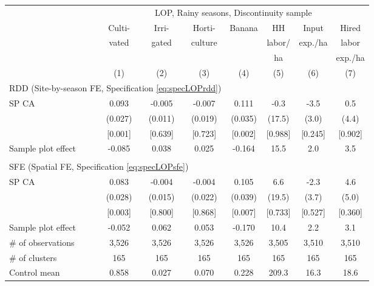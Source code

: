 \begin{tabular}{lccccccc}
\hline \hline
 & \multicolumn{7}{c}{LOP, Rainy seasons, Discontinuity sample} \\
\cmidrule(lr){2-8}
 & Culti- & Irri- & Horti- & Banana & HH & Input & Hired \\
 & vated & gated & culture & & labor/ & exp./ha & labor \\
 & & & & & ha & & exp./ha \\
\cmidrule(lr){2-2}\cmidrule(lr){3-3}\cmidrule(lr){4-4}\cmidrule(lr){5-5}\cmidrule(lr){6-6}\cmidrule(lr){7-7}\cmidrule(lr){8-8}
 & (1) & (2) & (3) & (4) & (5) & (6) & (7) \\
\hline
\multicolumn{4}{l}{RDD (Site-by-season FE, Specification \ref{eq:specLOPrdd})} & & & & \\
\cmidrule(lr){1-4}
SP CA & 0.093 & -0.005\hphantom{-} & -0.007\hphantom{-} & 0.111 & -0.3\hphantom{-} & -3.5\hphantom{-} & 0.5 \\
 & (0.027) & (0.011) & (0.019) & (0.035) & (17.5) & (3.0) & (4.4) \\
 & [0.001] & [0.639] & [0.723] & [0.002] & [0.988] & [0.245] & [0.902] \\
\cmidrule(lr){1-8}
Sample plot effect & -0.085 & 0.038 & 0.025 & -0.164 & 15.5 & 2.0 & 3.5 \\
\cmidrule(lr){1-8}
\\[-0.5em]
\multicolumn{4}{l}{SFE (Spatial FE, Specification \ref{eq:specLOPsfe})} & & & & \\
\cmidrule(lr){1-4}
SP CA & 0.083 & -0.004\hphantom{-} & -0.004\hphantom{-} & 0.105 & 6.6 & -2.3\hphantom{-} & 4.6 \\
 & (0.028) & (0.015) & (0.022) & (0.039) & (19.5) & (3.7) & (5.0) \\
 & [0.003] & [0.800] & [0.868] & [0.007] & [0.733] & [0.527] & [0.360] \\
\cmidrule(lr){1-8}
Sample plot effect & -0.052 & 0.062 & 0.053 & -0.170 & 10.4 & 2.2 & 3.1 \\
\hline
\# of observations & 3,526 & 3,526 & 3,526 & 3,526 & 3,505 & 3,510 & 3,510 \\
\# of clusters & 165 & 165 & 165 & 165 & 165 & 165 & 165 \\
Control mean & 0.858 & 0.027 & 0.070 & 0.228 & 209.3 & 16.3 & 18.6 \\
\hline
\end{tabular}
